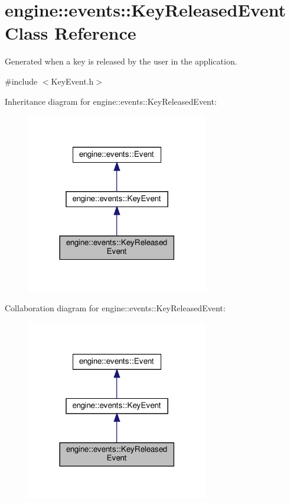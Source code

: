 \hypertarget{classengine_1_1events_1_1KeyReleasedEvent}{}\section{engine\+:\+:events\+:\+:Key\+Released\+Event Class Reference}
\label{classengine_1_1events_1_1KeyReleasedEvent}


Generated when a key is released by the user in the application.  




{\ttfamily \#include $<$Key\+Event.\+h$>$}



Inheritance diagram for engine\+:\+:events\+:\+:Key\+Released\+Event\+:
\nopagebreak
\begin{figure}[H]
\begin{center}
\leavevmode
\includegraphics[width=225pt]{classengine_1_1events_1_1KeyReleasedEvent__inherit__graph}
\end{center}
\end{figure}


Collaboration diagram for engine\+:\+:events\+:\+:Key\+Released\+Event\+:
\nopagebreak
\begin{figure}[H]
\begin{center}
\leavevmode
\includegraphics[width=225pt]{classengine_1_1events_1_1KeyReleasedEvent__coll__graph}
\end{center}
\end{figure}

